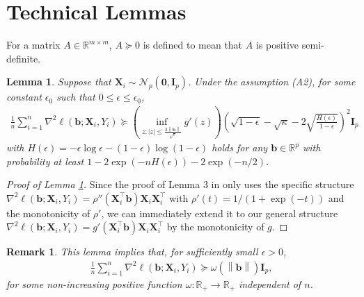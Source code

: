 \documentclass[12pt,reqno]{amsart}
\newtheorem{lemma}{Lemma}
\newtheorem{remark}{Remark}%
\newcommand{\norm}[1]{\left\lVert#1\right\rVert}
\newcommand{\rbr}[1]{\left(#1\right)}
\newcommand{\R}{\mathbb{R}}
\newcommand{\ccc}{\color{black}}
\def\bzero{\bm{0}}
\def\bb{\bm{b}}
\def\bI{\bm{I}}
\def\bX{\bm{X}}
\begin{document}
\section{Technical Lemmas}
For a matrix $A\in\R^{m\times m}$, $A\succeq0$ is defined to mean that $A$ is positive semi-definite.
\begin{lemma}
\label{lem:str-convex}
Suppose that $\bX_i\sim\mathcal{N}_p(\bzero,\bI_p)$. Under the assumption (A2), for some constant $\epsilon_0$ such that $0\le\epsilon\le\epsilon_0$, 
\begin{align*}
    \frac{1}{n}\sum_{i=1}^n\nabla^2\ell(\bb;\bX_i,Y_i)
    \succeq\rbr{\inf_{z:|z|\le\frac{3\norm{\bb}}{\sqrt{\epsilon}}}g'(z)}\rbr{\sqrt{1-\epsilon}-\sqrt{\kappa}-2\sqrt{\frac{H(\epsilon)}{1-\epsilon}}}^2\bI_p
\end{align*}
with $H(\epsilon)=-\epsilon\log\epsilon-(1-\epsilon)\log(1-\epsilon)$ holds for any $\bb\in\R^p$ with probability at least $1-2\exp(-nH(\epsilon))-2\exp(-n/2)$.
\end{lemma}
\begin{proof}[Proof of Lemma \ref{lem:str-convex}]
Since the proof of Lemma 3 in \cite{sur2019likelihood} only uses the specific structure $\nabla^2\ell(\bb;\bX_i,Y_i)=\rho''(\bX_i^\top\bb)\bX_i\bX_i^\top$ with $\rho'(t)=1/(1+\exp(-t))$ {\ccc and the monotonicity of $\rho'$}, we can immediately extend it to our general structure $\nabla^2\ell(\bb;\bX_i,Y_i)=g'(\bX_i^\top\bb)\bX_i\bX_i^\top$ {\ccc by the monotonicity of $g$}.
\end{proof}


\begin{remark}
    This lemma implies that, for sufficiently small $\epsilon>0$,
    \begin{align*}
        \frac{1}{n}\sum_{i=1}^n\nabla^2\ell(\bb;\bX_i,Y_i)\succeq\omega(\norm{\bb})\bI_p,
    \end{align*}
    for some non-increasing positive function $\omega:\R_+\to\R_+$ independent of $n$.
\end{remark}
\end{document}
